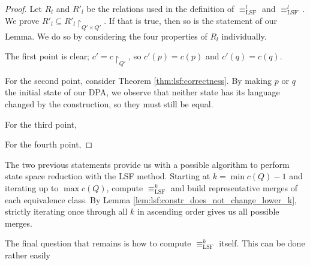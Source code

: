 \begin{proof}
	Let $R_l$ and $R'_l$ be the relations used in the definition of $\equiv_\text{LSF}^l$ and $\equiv_\text{LSF'}^l$. We prove $R'_l \subseteq R'_l \upharpoonright_{Q' \times Q'}$. If that is true, then so is the statement of our Lemma. We do so by considering the four properties of $R_l$ individually.
	
	The first point is clear; $c' = c \upharpoonright_{Q'}$, so $c'(p) = c(p)$ and $c'(q) = c(q)$.
	
	For the second point, consider Theorem \ref{thm:lsf:correctness}. By making $p$ or $q$ the initial state of our DPA, we observe that neither state has its language changed by the construction, so they must still be equal.
	
	For the third point, %
	
	For the fourth point, %
\end{proof}

The two previous statements provide us with a possible algorithm to perform state space reduction with the LSF method. Starting at $k = \min c(Q) - 1$ and iterating up to $\max c(Q)$, compute $\equiv_\text{LSF}^k$ and build representative merges of each equivalence class. By Lemma \ref{lem:lsf:constr_does_not_change_lower_k}, strictly iterating once through all $k$ in ascending order gives us all possible merges.

The final question that remains is how to compute $\equiv_\text{LSF}^k$ itself. This can be done rather easily 
















